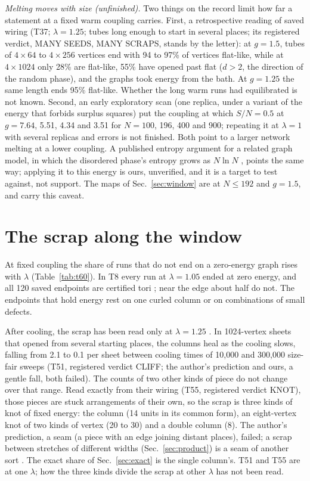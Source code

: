 \documentclass[aps,pre,10pt,twocolumn,superscriptaddress,nofootinbib]{revtex4-2}
\begin{document}
\emph{Melting moves with size (unfinished).} Two things on the record limit how far a statement at a fixed warm
coupling carries. First, a retrospective reading of saved wiring (T37; $\lambda=1.25$; tubes long enough to
start in several places; its registered verdict, MANY SEEDS, MANY SCRAPS, stands by the letter): at $g=1.5$, tubes of $4\times64$ to $4\times256$ vertices end with 94 to 97\% of
vertices flat-like, while at $4\times1024$ only 28\% are flat-like, 55\% have opened past flat ($d>2$, the
direction of the random phase), and the graphs took energy from the bath. At $g=1.25$ the same length ends 95\%
flat-like. Whether the long warm runs had equilibrated is not known. Second, an early exploratory scan (one
replica, under a variant of the energy that forbids surplus squares) put the coupling at which $S/N=0.5$ at
$g=7.64$, 5.51, 4.34 and 3.51 for $N=100$, 196, 400 and 900; repeating it at $\lambda=1$ with several replicas
and errors is not finished. Both point to a larger network melting at a lower coupling. A published entropy
argument for a related graph model, in which the disordered phase's entropy grows as $N\ln N$
\cite{K08,CP12}, points the same way; applying it to this energy is ours, unverified, and it is a target to
test against, not support. The maps of Sec.~\ref{sec:window} are at $N\le192$ and $g=1.5$, and carry this
caveat.

\section{The scrap along the window}
\label{sec:scrap}

At fixed coupling the share of runs that do not end on a zero-energy graph rises with $\lambda$
(Table~\ref{tab:t60}). In T8 every run at $\lambda=1.05$ ended at zero energy, and all 120 saved endpoints are
certified tori \cite{paper1}; near the edge about half do not. The endpoints that hold energy rest on one curled
column or on combinations of small defects.

After cooling, the scrap has been read only at $\lambda=1.25$ \cite{paper2}. In 1024-vertex sheets that opened
from several starting places, the columns heal as the cooling slows, falling from 2.1 to 0.1 per sheet between
cooling times of 10,000 and 300,000 size-fair sweeps (T51, registered verdict CLIFF; the author's prediction and
ours, a gentle fall, both failed). The counts of two other kinds of piece do not change over that range. Read
exactly from their wiring (T55, registered verdict KNOT), those pieces are stuck arrangements of their own, so the
scrap is three kinds of knot of fixed energy: the column (14 units in its common form), an eight-vertex knot of two
kinds of vertex (20 to 30) and a double column (8). The author's prediction, a seam (a piece with an edge joining
distant places), failed; a scrap between stretches of different widths (Sec.~\ref{sec:product}) is a seam of
another sort \cite{paper2}. The exact share of
Sec.~\ref{sec:exact} is the single column's. T51 and T55 are at one $\lambda$; how the three kinds divide the
scrap at other $\lambda$ has not been read.
\end{document}
